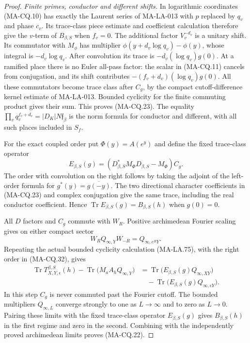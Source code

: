 \begin{proof}
\emph{Finite primes, conductor and different shifts.}
In logarithmic coordinates (MA-CQ.10)
has exactly the Laurent series of
MA-LA-013 with $p$ replaced by $q_v$
and phase $c_v$.  Its trace-class
piece estimate and coefficient
calculation therefore give the
$v$-term of $B_{\beta,S}$ when
$f_v=0$.
The additional factor $V_v^{-d_v}$
is a unitary shift.  Its commutator
with $M_\phi$ has multiplier
$\phi(y+d_v\log q_v)-\phi(y)$,
whose integral is $-d_v\log q_v$.
After convolution its trace is
$-d_v(\log q_v)g(0)$.
At a ramified place there is no
Euler all-pass factor: the scalar
in (MA-CQ.11) cancels from conjugation,
and its shift contributes
$-(f_v+d_v)(\log q_v)g(0)$.
All these commutators become trace
class after $C_g$, by the compact
cutoff-difference kernel estimate
of MA-LA-013.
Bounded cyclicity for the finite
commuting product gives their sum.
This proves (MA-CQ.23).
The equality
$\prod_v q_v^{f_v+d_v}
       =|D_K|N\mathfrak f_\beta$
is the norm formula for conductor
and different, with all such places
included in $S_f$.

For the exact coupled order put
$\Phi(y)=A(e^y)$ and define the fixed
trace-class operator
\[
 E_{\beta,S}(g)=
       (D_{\beta,S}^*M_\Phi D_{\beta,S}-M_\Phi)C_g.
\tag{MA-CQ.32}
\]
The order with convolution on the
right follows by taking the adjoint
of the left-order formula for
$g^*(y)=\overline{g(-y)}$.
The two directional character
coefficients in (MA-CQ.23) and
complex conjugation give the same
trace, including the real conductor
coefficient.  Hence
$\operatorname{Tr}E_{\beta,S}(g)
        =B_{\beta,S}(h)$ when $g(0)=0$.

All $D$ factors and $C_g$ commute
with $W_R$.  Positive archimedean
Fourier scaling gives on either
compact sector
\[
                W_RQ_{\infty,Y}W_{-R}
                         =Q_{\infty,e^R Y}.
\tag{MA-CQ.33}
\]
Repeating the actual bounded
cyclicity calculation (MA-LA.75),
with the right order in (MA-CQ.32),
gives
\[
\begin{aligned}
 \operatorname{Tr}T^{\beta,S}_{X,Y,\epsilon}(h)
  -\operatorname{Tr}\bigl(M_aA_hQ_{\infty,Y}\bigr)
   &=\operatorname{Tr}\bigl(E_{\beta,S}(g)Q_{\infty,XY}\bigr)\\
   &\quad-\operatorname{Tr}
           \bigl(E_{\beta,S}(g)Q_{\infty,\epsilon Y}\bigr).
\end{aligned}
\tag{MA-CQ.34}
\]
In this step $C_g$ is never commuted
past the Fourier cutoff.
The bounded multipliers
$Q_{\infty,L}$ converge strongly
to one as $L\to\infty$ and to zero
as $L\to0$.  Pairing these limits
with the fixed trace-class operator
$E_{\beta,S}(g)$ gives
$B_{\beta,S}(h)$ in the first
regime and zero in the second.
Combining with the independently
proved archimedean limits proves
(MA-CQ.22).
\end{proof}

